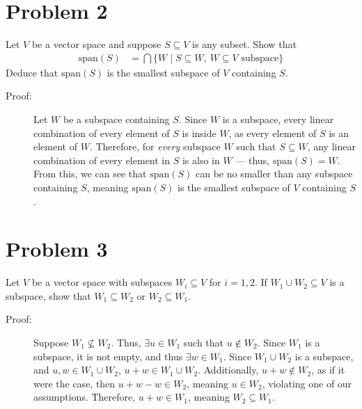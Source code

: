 \documentclass[10pt]{extarticle}
\begin{document}
  \section{Problem 2}%
  Let $V$ be a vector space and suppose $S\subseteq V$ is any subset. Show that
  \begin{align*}
    \text{span}(S) &= \bigcap \{W\mid S\subseteq W,~W\subseteq V \text{ subspace}\}
  \end{align*}
  Deduce that $\text{span}(S)$ is the smallest subspace of $V$ containing $S$.
  \begin{description}
    \item[Proof:] Let $W$ be a subspace containing $S$. Since $W$ is a subspace, every linear combination of every element of $S$ is inside $W$, as every element of $S$ is an element of $W$. Therefore, for \textit{every} subspace $W$ such that $S\subseteq W$, any linear combination of every element in $S$ is also in $W$ --- thus, $\text{span}(S) = W$.\\

      From this, we can see that $\text{span}(S)$ can be no smaller than any subspace containing $S$, meaning $\text{span}(S)$ is the smallest subspace of $V$ containing $S$.
  \end{description}
  \section{Problem 3}%
  Let $V$ be a vector space with subspaces $W_i\subseteq V$ for $i=1,2$. If $W_1\cup W_2\subseteq V$ is a subspace, show that $W_1\subseteq W_2$ or $W_2\subseteq W_1$.
  \begin{description}
    \item[Proof:] Suppose $W_1\nsubseteq W_2$. Thus, $\exists u\in W_1$ such that $u\notin W_2$. Since $W_1$ is a subspace, it is not empty, and thus $\exists w\in W_1$. Since $W_1\cup W_2$ is a subspace, and $u,w\in W_1\cup W_2$, $u+w\in W_1\cup W_2$. Additionally, $u+w\notin W_2$, as if it were the case, then $u+w-w\in W_2$, meaning $u\in W_2$, violating one of our assumptions. Therefore, $u+w\in W_1$, meaning $W_2\subseteq W_1$. 
  \end{description}
\end{document}
